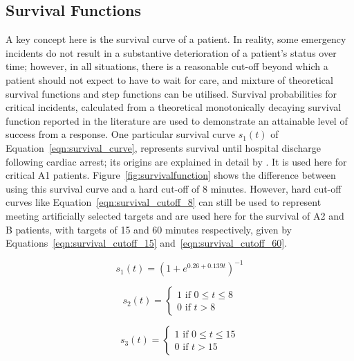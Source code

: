 \documentclass[preprint,12pt]{elsarticle}
\begin{document}
\subsection{Survival Functions}\label{sec:survival}
A key concept here is the survival curve of a patient.
In reality, some emergency incidents do not result in a substantive deterioration of a patient’s status over time; however, in all situations, there is a reasonable cut-off beyond which a patient should not expect to have to wait for care, and mixture of theoretical survival functions and step functions can be utilised.
Survival probabilities for critical incidents, calculated from a theoretical monotonically decaying survival function reported in the literature \cite{Valenzuela20001206} are used to demonstrate an attainable level of success from a response. One particular survival curve $s_1(t)$ of Equation~\ref{eqn:survival_curve}, represents survival until hospital discharge following cardiac arrest; its origins are explained in detail by \cite{Knight2012918}. It is used here for critical A1 patients. Figure~\ref{fig:survivalfunction} shows the difference between using this survival curve and a hard cut-off of 8 minutes.
However, hard cut-off curves like Equation~\ref{eqn:survival_cutoff_8} can still be used to represent meeting artificially selected targets and are used here for the survival of A2 and B patients, with targets of 15 and 60 minutes respectively, given by Equations~\ref{eqn:survival_cutoff_15} and~\ref{eqn:survival_cutoff_60}.

\begin{equation}\label{eqn:survival_curve}
    s_1(t) = \left(1 + e^{0.26+0.139t}\right)^{-1}
\end{equation}

\begin{equation}\label{eqn:survival_cutoff_8}
    s_2(t) = \begin{cases} 
    1 \text{ if } 0\leq t \leq 8 \\
    0 \text{ if } t > 8 
    \end{cases}
\end{equation}

\begin{equation}\label{eqn:survival_cutoff_15}
    s_3(t) = \begin{cases} 
    1 \text{ if } 0\leq t \leq 15 \\
    0 \text{ if } t > 15 
    \end{cases}
\end{equation}
\end{document}
